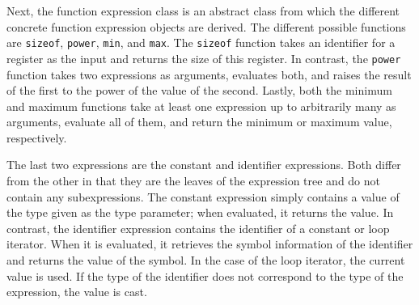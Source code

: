 Next, the function expression class is an abstract class from which the different concrete function expression objects are derived. The different possible functions are \texttt{sizeof}, \texttt{power}, \texttt{min}, and \texttt{max}. The \texttt{sizeof} function takes an identifier for a register as the input and returns the size of this register. In contrast, the \texttt{power} function takes two expressions as arguments, evaluates both, and raises the result of the first to the power of the value of the second. Lastly, both the minimum and maximum functions take at least one expression up to arbitrarily many as arguments, evaluate all of them, and return the minimum or maximum value, respectively.

The last two expressions are the constant and identifier expressions. Both differ from the other in that they are the leaves of the expression tree and do not contain any subexpressions. The constant expression simply contains a value of the type given as the type parameter; when evaluated, it returns the value. In contrast, the identifier expression contains the identifier of a constant or loop iterator. When it is evaluated, it retrieves the symbol information of the identifier and returns the value of the symbol. In the case of the loop iterator, the current value is used. If the type of the identifier does not correspond to the type of the expression, the value is cast.